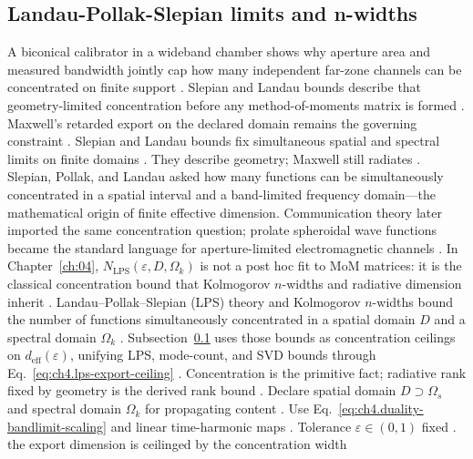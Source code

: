 \subsection{Landau-Pollak-Slepian limits and n-widths}
\label{sec:ch484}
A biconical calibrator in a wideband chamber shows why aperture area and measured bandwidth jointly cap how many independent far-zone channels can be concentrated on finite support \cite{hansen1988}. Slepian and Landau bounds describe that geometry-limited concentration before any method-of-moments matrix is formed \cite{slepian1961}. Maxwell's retarded export on the declared domain remains the governing constraint \cite{maxwell1873}.
Slepian and Landau bounds fix simultaneous spatial and spectral limits on finite domains \cite{landau1962}. They describe geometry; Maxwell still radiates \cite{maxwell1873}.
Slepian, Pollak, and Landau \cite{slepian1961} asked how many functions can be simultaneously concentrated in a spatial interval and a band-limited frequency domain---the mathematical origin of finite effective dimension. Communication theory later imported the same concentration question; prolate spheroidal wave functions became the standard language for aperture-limited electromagnetic channels \cite{hansen1988}. In Chapter~\ref{ch:04}, $N_{\mathrm{LPS}}(\varepsilon,D,\Omega_k)$ is not a post hoc fit to MoM matrices: it is the classical concentration bound that Kolmogorov $n$-widths and radiative dimension inherit \cite{stratton1941}.
Landau--Pollak--Slepian (LPS) theory and Kolmogorov \(n\)-widths bound the number of functions simultaneously concentrated in a spatial domain
\(D\) and a spectral domain \(\Omega_{k}\) \cite{hansen1988}. Subsection~\ref{sec:ch484} uses those bounds as concentration ceilings
on \(d_{\mathrm{eff}}(\varepsilon)\), unifying LPS, mode-count, and SVD bounds through Eq.~\eqref{eq:ch4.lps-export-ceiling}
\cite{harrington2001}. Concentration is the primitive fact; radiative rank fixed by geometry is the derived rank bound
\cite{stratton1941}.
Declare spatial domain \(D\supset\Omega_{s}\) and spectral domain \(\Omega_{k}\) for propagating content \cite{stratton1941}.
Use Eq.~\eqref{eq:ch4.duality-bandlimit-scaling} and linear time-harmonic maps \cite{harrington2001}. Tolerance \(\varepsilon\in(0,1)\)
fixed \cite{hansen1988}.
the export dimension is ceilinged by the concentration width
